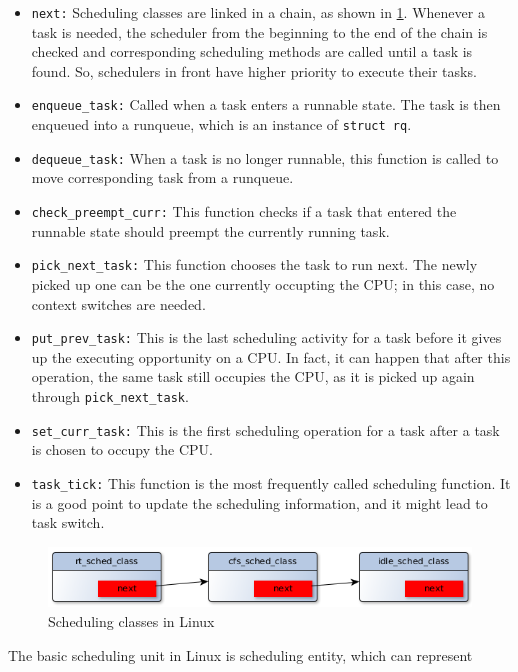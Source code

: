 \begin{itemize} 
\item \texttt{next:}
	Scheduling classes are linked in a chain, as shown 
	in \ref{fig:sched_classes}.  Whenever a task is needed,
	the scheduler from the beginning to the end of the chain 
	is checked and corresponding scheduling methods are called
	until a task is found. So, schedulers in front have higher 
	priority to execute their tasks. 
\item \texttt{enqueue\_task:}
	Called when a task enters a runnable state. The task is then 
	enqueued into a runqueue, which is an instance of \texttt{struct rq}.
\item \texttt{dequeue\_task:}
	When a task is no longer runnable, this function is called to move
	corresponding task from a runqueue.
\item \texttt{check\_preempt\_curr:}
	This function checks if a task that entered the runnable state 
	should preempt the currently running task.
\item \texttt{pick\_next\_task:}
	This function chooses the task to run next. The newly picked up
	one can be the one currently occupting the CPU; in this case,
	no context switches are needed.
\item \texttt{put\_prev\_task:}
	This is the last scheduling activity for a task before it gives
	up the executing opportunity on a CPU. In fact, it can happen
	that after this operation, the same task still occupies the 
	CPU, as it is picked up again through \texttt{pick\_next\_task}.
\item \texttt{set\_curr\_task:}
	This is the first scheduling operation for a task after a task 
	is chosen to occupy the CPU.
\item \texttt{task\_tick:}
	This function is the most frequently called scheduling function. 
	It is a good point to update the scheduling information, and 
	it might lead to task switch.
\end{itemize} 
\begin{figure}[htbp]
        \centering
        \includegraphics[width=\textwidth]{images/sched_classes}
        \caption{Scheduling classes in Linux}
        \label{fig:sched_classes}
\end{figure}
The basic scheduling unit in Linux is scheduling entity, which can represent
